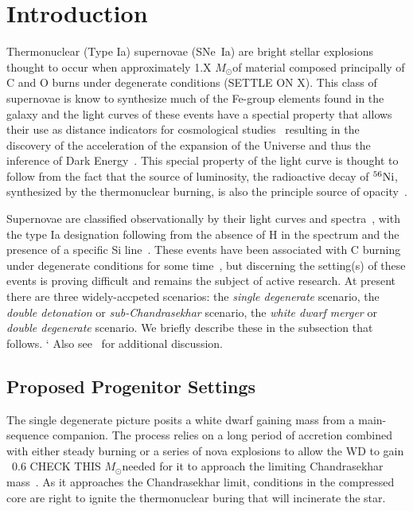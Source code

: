 \documentclass[iop,apj]{emulateapj}
\newcommand{\SNeIa}{SNe~Ia}
\newcommand{\Ni}[1]{\ensuremath{{}^{#1}{\rm Ni}}}
\newcommand{\Msun}{\ensuremath{M_\odot}}
\begin{document}
\section{Introduction}
\label{sec:intro}
Thermonuclear (Type Ia) supernovae (\SNeIa) are bright stellar explosions 
thought to occur when approximately 1.X \Msun of material composed principally 
of C and O burns under degenerate conditions (SETTLE ON X). This class of supernovae is
know to synthesize much of the Fe-group elements found in the galaxy and
the light curves of these events have a spectial property that allows
their use as distance indicators for cosmological studies~\citep{phillips:absolute}
resulting in the discovery of the acceleration of the expansion of
the Universe and thus the inference of Dark 
Energy~\citep{riess.filippenko.ea:observational,
perlmutter.aldering.ea:measurements,leibundgut2001}. 
This special property of the light curve is thought to follow
from the fact that the source of luminosity, the radioactive decay
of \Ni{56}, synthesized by the thermonuclear burning, is also the
principle source of opacity~\citep{Pinto2001The-type-Ia-sup}. 

Supernovae are classified observationally 
by their light curves and spectra~\citep{minkowski41,bertola64,porterfilippenko87,
wheelerharkness1990conf,Fili97}, with the type Ia designation following from
the absence of H in the spectrum and the presence of a specific Si 
line~\citep{filippenko:optical,hillebrandt.niemeyer:type}. These events
have been associated with C burning under degenerate conditions
for some time~\citep{hoylefowler60,arnett.truran.ea:nucleosynthesis},
but discerning the setting(s) of these events is proving difficult
and remains the subject of active research. At present there are three
widely-accpeted scenarios: the {\em single degenerate} scenario,
the {\em double detonation} or {\em sub-Chandrasekhar} scenario, 
the {\em white dwarf merger} or {\em double degenerate} scenario.
We briefly describe these in the subsection that follows. `
Also see~\citet{hillebrandt.niemeyer:type,howell2011,hillebrandtetal2013,calderetal2013}
for additional discussion.

\subsection{Proposed Progenitor Settings}

The single degenerate picture posits a white dwarf gaining mass
from a main-sequence companion. The process relies on a long
period of accretion combined with either steady burning or a 
series of nova explosions to allow the WD to gain
~0.6 CHECK THIS \Msun needed for it to approach the
limiting Chandrasekhar mass~\citep{starrfieldetal2012}. As it approaches
the Chandrasekhar limit, conditions in the compressed core are right
to ignite the thermonuclear buring that will incinerate the star. 
\end{document}
